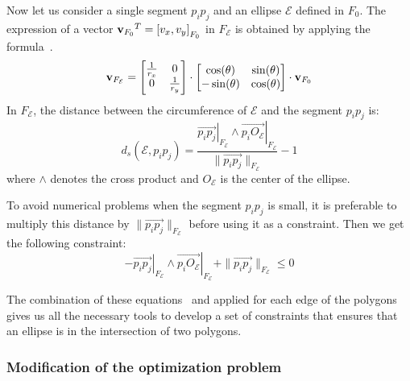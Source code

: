 Now let us consider a single segment $p_i p_j$ and an ellipse $\mathcal{E}$ defined in $F_0$.
The expression of a vector ${{\bf v}_{F_0}}^T = {[v_x, v_y]}_{F_0}$ in $F_\mathcal{E}$ is obtained by applying the formula~.
\begin{equation}
{\bf v}_{F_\mathcal{E}} =
\begin{bmatrix}
\frac{1}{r_x} & 0 \\
0 & \frac{1}{r_y}
\end{bmatrix}
\cdot \begin{bmatrix}
\cos(\theta) & \sin(\theta) \\
-\sin(\theta) & \cos(\theta)
\end{bmatrix}
\cdot {\bf v}_{F_0}
\label{eq:F0-to-FE}
\end{equation}
In $F_\mathcal{E}$, the distance between the circumference of $\mathcal{E}$ and the segment $p_i p_j$ is:
\begin{equation}
  d_s(\mathcal{E}, p_i p_j) = \frac{{\left.\overrightarrow{p_i p_j}\right|}_{F_\mathcal{E}} \wedge {\left.\overrightarrow{p_i O_\mathcal{E}}\right|}_{F_\mathcal{E} } }{\| \overrightarrow{p_i p_j}\|_{F_\mathcal{E} } }-1
\end{equation}
where $\wedge$ denotes the cross product and $O_{\mathcal{E}}$ is the center of the ellipse.

To avoid numerical problems when the segment $p_i p_j$ is small, it is preferable to multiply this distance by $\| \overrightarrow{p_i p_j}\|_{F_\mathcal{E}}$ before using it as a constraint.
Then we get the following constraint:
\begin{equation}
  -{\left.\overrightarrow{p_i p_j}\right|}_{F_\mathcal{E}} \wedge {\left.\overrightarrow{p_i O_\mathcal{E}}\right|}_{F_\mathcal{E}}+\| \overrightarrow{p_i p_j}\|_{F_\mathcal{E}} \leq 0
\label{eq:pseudo-distance}
\end{equation}

The combination of these equations~ and  applied for each edge of the polygons gives us all the necessary tools to develop a set of constraints that ensures that an ellipse is in the intersection of two polygons.



\subsubsection{Modification of the optimization problem}


